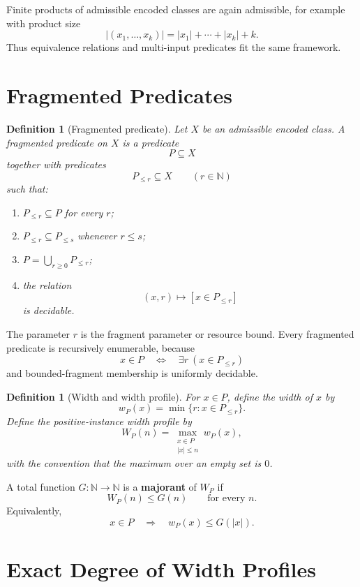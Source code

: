 \documentclass[11pt]{article}
\newtheorem{definition}[theorem]{Definition}
\begin{document}
Finite products of admissible encoded classes are again admissible, for example with product size
\[
|(x_1,\ldots,x_k)|=|x_1|+\cdots+|x_k|+k.
\]
Thus equivalence relations and multi-input predicates fit the same framework.

\section{Fragmented Predicates}

\begin{definition}[Fragmented predicate]
Let \(X\) be an admissible encoded class. A fragmented predicate on \(X\) is a predicate
\[
P\subseteq X
\]
together with predicates
\[
P_{\le r}\subseteq X
\qquad
(r\in\mathbb N)
\]
such that:
\begin{enumerate}[label=(\roman*)]
\item \(P_{\le r}\subseteq P\) for every \(r\);
\item \(P_{\le r}\subseteq P_{\le s}\) whenever \(r\le s\);
\item \(P=\bigcup_{r\ge0}P_{\le r}\);
\item the relation
\[
(x,r)\longmapsto [x\in P_{\le r}]
\]
is decidable.
\end{enumerate}
\end{definition}

The parameter \(r\) is the fragment parameter or resource bound. Every fragmented predicate is recursively enumerable, because
\[
x\in P
\quad\Longleftrightarrow\quad
\exists r\ (x\in P_{\le r})
\]
and bounded-fragment membership is uniformly decidable.

\begin{definition}[Width and width profile]
For \(x\in P\), define the width of \(x\) by
\[
w_P(x)=\min\{r:x\in P_{\le r}\}.
\]
Define the positive-instance width profile by
\[
W_P(n)=
\max_{\substack{x\in P\\ |x|\le n}}
w_P(x),
\]
with the convention that the maximum over an empty set is \(0\).
\end{definition}

A total function \(G:\mathbb N\to\mathbb N\) is a \textbf{majorant} of \(W_P\) if
\[
W_P(n)\le G(n)
\qquad
\text{for every }n.
\]
Equivalently,
\[
x\in P
\quad\Longrightarrow\quad
w_P(x)\le G(|x|).
\]

\section{Exact Degree of Width Profiles}
\end{document}
